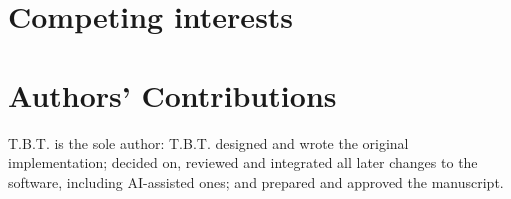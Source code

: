 \documentclass[11pt,a4paper]{article}
\begin{document}
\section*{Competing interests}

\CompetingText

\section*{Authors' Contributions}

T.B.T. is the sole author: T.B.T. designed and wrote the original implementation; decided on, reviewed and integrated all later changes to the software, including AI-assisted ones; and prepared and approved the manuscript.

\printbibliography[heading=subbibintoc, title={References}]
\end{document}
